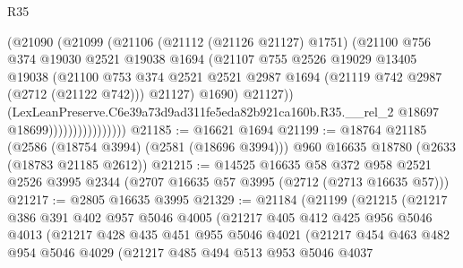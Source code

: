 \begin{lexlean}{R35}
\begin{coremodule}
                              (@21090
                                (@21099
                                  (@21106
                                    (@21112 (@21126 @21127) @1751)
                                    (@21100
                                      @756
                                      @374
                                      @19030
                                      @2521
                                      @19038
                                      @1694
                                      (@21107
                                        @755
                                        @2526
                                        @19029
                                        @13405
                                        @19038
                                        (@21100
                                          @753
                                          @374
                                          @2521
                                          @2521
                                          @2987
                                          @1694
                                          (@21119 @742 @2987 (@2712 (@21122 @742)))
                                          @21127)
                                        @1690)
                                      @21127))
                                  (LexLeanPreserve.C6e39a73d9ad311fe5eda82b921ca160b.R35.__rel_2
                                    @18697
                                    @18699))))))))))))))))
@21185 := @16621 @1694
@21199 := @18764
    @21185
    (@2586 (@18754 @3994) (@2581 (@18696 @3994)))
    @960
    @16635
    @18780
    (@2633 (@18783 @21185 @2612))
@21215 := @14525
    @16635
    @58
    @372
    @958
    @2521
    @2526
    @3995
    @2344
    (@2707 @16635 @57 @3995 (@2712 (@2713 @16635 @57)))
@21217 := @2805 @16635 @3995
@21329 := @21184
    (@21199
      (@21215
        (@21217
          @386
          @391
          @402
          @957
          @5046
          @4005
          (@21217
            @405
            @412
            @425
            @956
            @5046
            @4013
            (@21217
              @428
              @435
              @451
              @955
              @5046
              @4021
              (@21217
                @454
                @463
                @482
                @954
                @5046
                @4029
                (@21217
                  @485
                  @494
                  @513
                  @953
                  @5046
                  @4037

\end{coremodule}
\end{lexlean}

